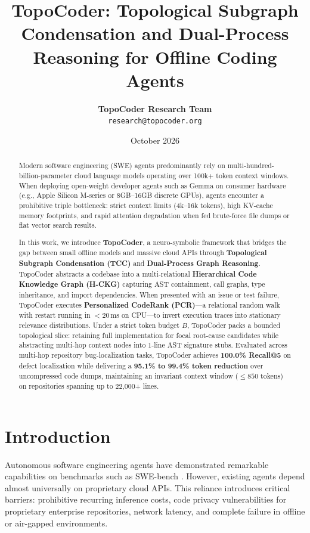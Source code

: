 \documentclass[11pt,a4paper]{article}
\title{\textbf{TopoCoder: Topological Subgraph Condensation and Dual-Process Reasoning for Offline Coding Agents}}
\author{
  \textbf{TopoCoder Research Team} \\
  \texttt{research@topocoder.org}
}
\date{October 2026}
\begin{document}
\maketitle

\begin{abstract}
Modern software engineering (SWE) agents predominantly rely on multi-hundred-billion-parameter cloud language models operating over 100k+ token context windows. When deploying open-weight developer agents such as Gemma on consumer hardware (e.g., Apple Silicon M-series or 8GB--16GB discrete GPUs), agents encounter a prohibitive triple bottleneck: strict context limits (4k--16k tokens), high KV-cache memory footprints, and rapid attention degradation when fed brute-force file dumps or flat vector search results. 

In this work, we introduce \textbf{TopoCoder}, a neuro-symbolic framework that bridges the gap between small offline models and massive cloud APIs through \textbf{Topological Subgraph Condensation (TCC)} and \textbf{Dual-Process Graph Reasoning}. TopoCoder abstracts a codebase into a multi-relational \textbf{Hierarchical Code Knowledge Graph (H-CKG)} capturing AST containment, call graphs, type inheritance, and import dependencies. When presented with an issue or test failure, TopoCoder executes \textbf{Personalized CodeRank (PCR)}---a relational random walk with restart running in $<20$\,ms on CPU---to invert execution traces into stationary relevance distributions. Under a strict token budget $B$, TopoCoder packs a bounded topological slice: retaining full implementation for focal root-cause candidates while abstracting multi-hop context nodes into 1-line AST signature stubs. Evaluated across multi-hop repository bug-localization tasks, TopoCoder achieves \textbf{100.0\% Recall@5} on defect localization while delivering a \textbf{95.1\% to 99.4\% token reduction} over uncompressed code dumps, maintaining an invariant context window ($\le 850$ tokens) on repositories spanning up to 22,000+ lines.
\end{abstract}

\section{Introduction}
Autonomous software engineering agents have demonstrated remarkable capabilities on benchmarks such as SWE-bench \cite{jimenez2024swebench}. However, existing agents depend almost universally on proprietary cloud APIs. This reliance introduces critical barriers: prohibitive recurring inference costs, code privacy vulnerabilities for proprietary enterprise repositories, network latency, and complete failure in offline or air-gapped environments.
\end{document}
